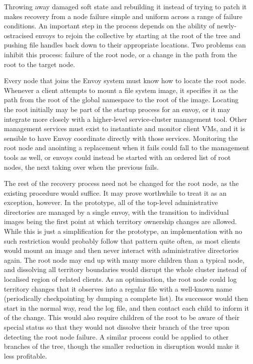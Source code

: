 Throwing away damaged soft state and rebuilding it instead of trying to patch it makes recovery from a node failure simple and uniform across a range of failure conditions. An important step in the process depends on the ability of newly-ostracised envoys to rejoin the collective by starting at the root of the tree and pushing file handles back down to their appropriate locations. Two problems can inhibit this process: failure of the root node, or a change in the path from the root to the target node.

Every node that joins the Envoy system must know how to locate the root node. Whenever a client attempts to mount a file system image, it specifies it as the path from the root of the global namespace to the root of the image. Locating the root initially may be part of the startup process for an envoy, or it may integrate more closely with a higher-level service-cluster management tool. Other management services must exist to instantiate and monitor client VMs, and it is sensible to have Envoy coordinate directly with those services. Monitoring the root node and anointing a replacement when it fails could fall to the management tools as well, or envoys could instead be started with an ordered list of root nodes, the next taking over when the previous fails.

The rest of the recovery process need not be changed for the root node, as the existing procedure would suffice. It may prove worthwhile to treat it as an exception, however. In the prototype, all of the top-level administrative directories are managed by a single envoy, with the transition to individual images being the first point at which territory ownership changes are allowed. While this is just a simplification for the prototype, an implementation with no such restriction would probably follow that pattern quite often, as most clients would mount an image and then never interact with administrative directories again. The root node may end up with many more children than a typical node, and dissolving all territory boundaries would disrupt the whole cluster instead of localised region of related clients. As an optimisation, the root node could log territory changes that it observes into a regular file with a well-known name (periodically checkpointing by dumping a complete list). Its successor would then start in the normal way, read the log file, and then contact each child to inform it of the change. This would also require children of the root to be aware of their special status so that they would not dissolve their branch of the tree upon detecting the root node failure. A similar process could be applied to other branches of the tree, though the smaller reduction in disruption would make it less profitable.

